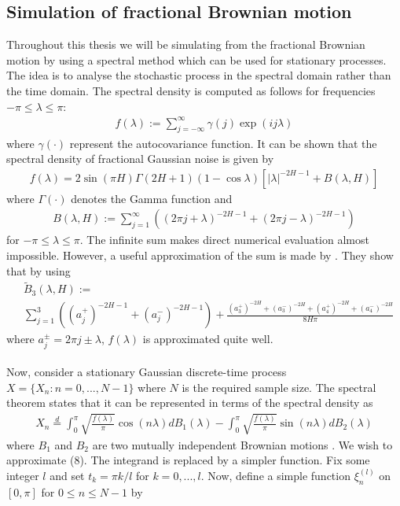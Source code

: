 \documentclass{article}
\begin{document}
\subsection{Simulation of fractional Brownian motion} \label{sec:sim_fbm}
Throughout this thesis we will be simulating from the fractional Brownian motion by using a spectral method which can be used for stationary processes. The idea is to analyse the stochastic process in the spectral domain rather than the time domain. The spectral density is computed as follows for frequencies $-\pi\leq \lambda \leq \pi$:
\begin{align}
f(\lambda):= \sum_{j=-\infty}^\infty \gamma(j) \exp(ij\lambda)
\end{align}
where $\gamma(\cdot)$ represent the autocovariance function. It can be shown that the spectral density of fractional Gaussian noise is given by
\begin{align}
f(\lambda) = 2\sin(\pi H)\Gamma(2H+1)(1-\cos\lambda)[\vert\lambda\vert ^{-2H-1}+B(\lambda, H)]
\end{align}
where $\Gamma(\cdot)$ denotes the Gamma function and 
\begin{align}
B(\lambda, H) := \sum_{j=1}^\infty \left((2\pi j+\lambda)^{-2H-1}+(2\pi j-\lambda)^{-2H-1}\right)
\end{align}
for $-\pi\leq \lambda \leq \pi$. The infinite sum makes direct numerical evaluation almost impossible. However, a useful approximation of the sum is made by \cite{paxson}. They show that by using
\begin{align*}
&\tilde{B}_3(\lambda, H) :=\\ 
&\sum_{j=1}^3 \left(\left(a_j^+\right)^{-2H-1}+\left(a_j^-\right)^{-2H-1}\right)+\frac{\left(a_3^+\right)^{-2H}+\left(a_3^-\right)^{-2H}+\left(a_4^+\right)^{-2H}+\left(a_4^-\right)^{-2H}}{8H\pi}
\end{align*}
where $a^{\pm}_j=2\pi j\pm \lambda$, $f(\lambda)$ is approximated quite well.\\\\
Now, consider a stationary Gaussian discrete-time process $X=\{X_n: n = 0,...,N-1\}$ where $N$ is the required sample size. The spectral theorem states that it can be represented in terms of the spectral density as
\begin{align}
X_n\overset{d}{=}\int_0^\pi \sqrt{\frac{f(\lambda)}{\pi}}\cos(n\lambda)dB_1(\lambda)-\int_0^\pi \sqrt{\frac{f(\lambda)}{\pi}}\sin(n\lambda)dB_2(\lambda)
\end{align}
where $B_1$ and $B_2$ are two mutually independent Brownian motions \cite{dieker}. We wish to approximate (8). The integrand is replaced by a simpler function. Fix some integer $l$ and set $t_k = \pi k/l$ for $k=0,...,l$. Now, define a simple function $\xi_n^{(l)}$ on $[0,\pi]$ for $0\leq n\leq N-1$ by 
\end{document}
